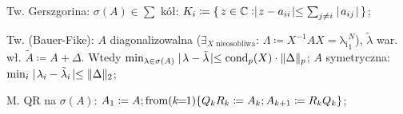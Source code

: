 \entry
Tw. Gerszgorina:
$\sigma(A) \in  \sum$ kół:
$K_i \coloneqq \set{z\in\mathbb{C}: \shortabs{z - a_{ii}} \leq \sum_{j \neq i}\shortabs{a_{ij}}}$;

\entry
Tw. (Bauer-Fike):
$A$ diagonalizowalna
($\exists_{X\text{ nieosobliwa}}$: $\Lambda \coloneqq X^{-1}AX=\mathrm{\lambda_i}_1^N$),
$\tilde{\lambda}$ war. wł. $\tilde{A} \coloneqq A + \Delta$.
Wtedy
$\min_{\lambda \in \sigma(A)} \shortabs{\lambda - \tilde{\lambda}} \leq
\cond[p]{X} \cdot \norm{\Delta}_p$;
\entry
$A$ symetryczna:
$\min_i\shortabs{\lambda_i - \tilde{\lambda}_i} \leq \norm{\Delta}_2$;

\entry
M. QR na $\sigma(A)$:
$ A_1 \coloneqq A;
\fromloop[1]{k}\{
Q_k R_k \coloneqq A_k;
A_{k+1} \coloneqq R_k Q_k
\} $;
